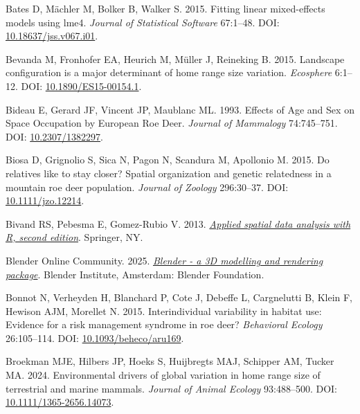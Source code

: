 \documentclass[10pt,a4paper]{article}
\newlength{\cslhangindent}
\newenvironment{CSLReferences}[2] %
 {\begin{list}{}{%
  \setlength{\itemindent}{0pt}
  \setlength{\leftmargin}{0pt}
  \setlength{\parsep}{0pt}
  \ifodd #1
   \setlength{\leftmargin}{\cslhangindent}
   \setlength{\itemindent}{-1\cslhangindent}
  \fi
  \setlength{\itemsep}{#2\baselineskip}}}
 {\end{list}}
\begin{document}
\begin{CSLReferences}{1}{0}
Bates D, Mächler M, Bolker B, Walker S. 2015. Fitting linear mixed-effects models using {lme4}. \emph{Journal of Statistical Software} 67:1--48. DOI: \href{https://doi.org/10.18637/jss.v067.i01}{10.18637/jss.v067.i01}.

Bevanda M, Fronhofer EA, Heurich M, Müller J, Reineking B. 2015. Landscape configuration is a major determinant of home range size variation. \emph{Ecosphere} 6:1--12. DOI: \href{https://doi.org/10.1890/ES15-00154.1}{10.1890/ES15-00154.1}.

Bideau E, Gerard JF, Vincent JP, Maublanc ML. 1993. Effects of {Age} and {Sex} on {Space} {Occupation} by {European} {Roe} {Deer}. \emph{Journal of Mammalogy} 74:745--751. DOI: \href{https://doi.org/10.2307/1382297}{10.2307/1382297}.

Biosa D, Grignolio S, Sica N, Pagon N, Scandura M, Apollonio M. 2015. Do relatives like to stay closer? {Spatial} organization and genetic relatedness in a mountain roe deer population. \emph{Journal of Zoology} 296:30--37. DOI: \href{https://doi.org/10.1111/jzo.12214}{10.1111/jzo.12214}.

Bivand RS, Pebesma E, Gomez-Rubio V. 2013. \emph{\href{https://asdar-book.org/}{Applied spatial data analysis with {R}, second edition}}. Springer, NY.

Blender Online Community. 2025. \emph{\href{http://www.blender.org}{Blender - a 3D modelling and rendering package}}. Blender Institute, Amsterdam: Blender Foundation.

Bonnot N, Verheyden H, Blanchard P, Cote J, Debeffe L, Cargnelutti B, Klein F, Hewison AJM, Morellet N. 2015. Interindividual variability in habitat use: Evidence for a risk management syndrome in roe deer? \emph{Behavioral Ecology} 26:105--114. DOI: \href{https://doi.org/10.1093/beheco/aru169}{10.1093/beheco/aru169}.

Broekman MJE, Hilbers JP, Hoeks S, Huijbregts MAJ, Schipper AM, Tucker MA. 2024. Environmental drivers of global variation in home range size of terrestrial and marine mammals. \emph{Journal of Animal Ecology} 93:488--500. DOI: \href{https://doi.org/10.1111/1365-2656.14073}{10.1111/1365-2656.14073}.


\end{CSLReferences}
\end{document}
